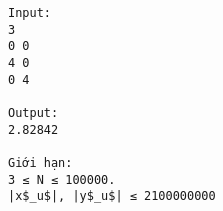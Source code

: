\begin{verbatim}
Input:
3
0 0
4 0
0 4

Output:
2.82842

Giới hạn:
3 ≤ N ≤ 100000. 
|x$_u$|, |y$_u$| ≤ 2100000000

\end{verbatim}